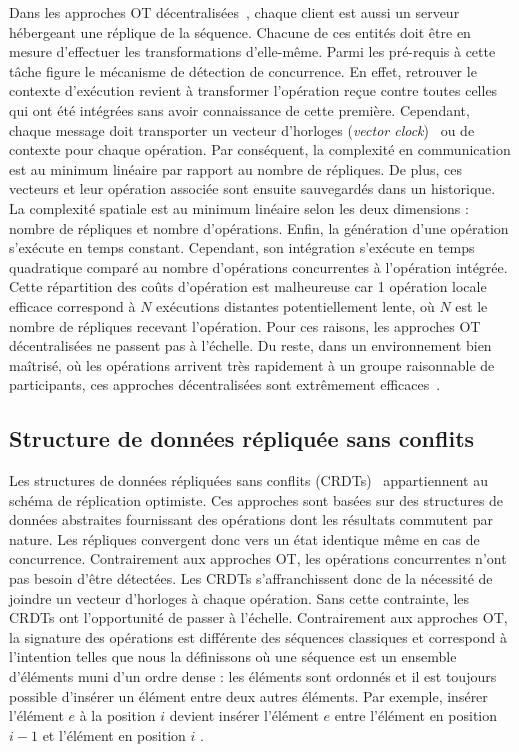 Dans les approches OT décentralisées~\cite{sun2009contextbased}, chaque client
est aussi un serveur hébergeant une réplique de la séquence. Chacune de ces
entités doit être en mesure d'effectuer les transformations d'elle-même. Parmi
les pré-requis à cette tâche figure le mécanisme de détection de concurrence. En
effet, retrouver le contexte d'exécution revient à transformer l'opération reçue
contre toutes celles qui ont été intégrées sans avoir connaissance de cette
première. Cependant, chaque message doit transporter un vecteur d'horloges
(\emph{vector clock})~\cite{lamport1978time} ou de contexte pour chaque
opération. Par conséquent, la complexité en communication est au minimum
linéaire par rapport au nombre de répliques. De plus, ces vecteurs et leur
opération associée sont ensuite sauvegardés dans un historique. La complexité
spatiale est au minimum linéaire selon les deux dimensions : nombre de répliques
et nombre d'opérations. Enfin, la génération d'une opération s'exécute en temps
constant. Cependant, son intégration s'exécute en temps quadratique comparé au
nombre d'opérations concurrentes à l'opération intégrée. Cette répartition des
coûts d'opération est malheureuse car 1 opération locale efficace correspond à
$N$ exécutions distantes potentiellement lente, où $N$ est le nombre de
répliques recevant l'opération. Pour ces raisons, les approches OT
décentralisées ne passent pas à l'échelle. Du reste, dans un environnement bien
maîtrisé, où les opérations arrivent très rapidement à un groupe raisonnable de
participants, ces approches décentralisées sont extrêmement
efficaces~\cite{mehdi2014merging}.

\subsection{Structure de données répliquée sans conflits}
\label{repl:subsec:crdts}

Les structures de données répliquées sans conflits
(CRDTs)~\cite{shapiro2011comprehensive, shapiro2011conflict} appartiennent au
schéma de réplication optimiste. Ces approches sont basées sur des structures de
données abstraites fournissant des opérations dont les résultats commutent par
nature. Les répliques convergent donc vers un état identique même en cas de
concurrence. Contrairement aux approches OT, les opérations concurrentes n'ont
pas besoin d'être détectées. Les CRDTs s'affranchissent donc de la nécessité de
joindre un vecteur d'horloges à chaque opération. Sans cette contrainte, les
CRDTs ont l'opportunité de passer à l'échelle. Contrairement aux approches OT,
la signature des opérations est différente des séquences \og classiques \fg et
correspond à l'intention telles que nous la définissons où une séquence est un
ensemble d'éléments muni d'un ordre dense : les éléments sont ordonnés et il est
toujours possible d'insérer un élément entre deux autres éléments. Par exemple,
\og insérer l'élément $e$ à la position $i$ \fg devient \og insérer l'élément
$e$ entre l'élément en position $i-1$ et l'élément en position $i$ \fg.

